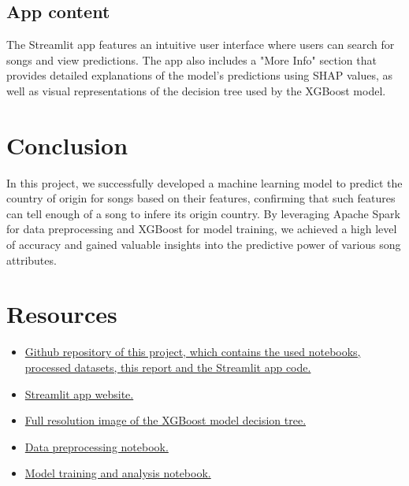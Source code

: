 \documentclass{article}
\begin{document}
\subsection{App content}
The Streamlit app features an intuitive user interface where users can search for songs and view predictions. The app also includes a "More Info" section that provides detailed explanations of the model's predictions using SHAP values, as well as visual representations of the decision tree used by the XGBoost model.

\section{Conclusion}
In this project, we successfully developed a machine learning model to predict the country of origin for songs based on their features, confirming that such features can tell enough of a song to infere its origin country. By leveraging Apache Spark for data preprocessing and XGBoost for model training, we achieved a high level of accuracy and gained valuable insights into the predictive power of various song attributes.

\section{Resources}

\begin{itemize}
    \item \href{https://github.com/FerranAD/songmap}{Github repository of this project, which contains the used notebooks, processed datasets, this report and the Streamlit app code.}
    \item \href{https://songmap.xyz}{Streamlit app website.}
    \item \href{https://raw.githubusercontent.com/FerranAD/songmap/main/images/xgb_tree.png}{Full resolution image of the XGBoost model decision tree.}
    \item \href{https://github.com/FerranAD/songmap/blob/main/preprocessing.ipynb}{Data preprocessing notebook.}
    \item \href{https://github.com/FerranAD/songmap/blob/main/analysis.ipynb}{Model training and analysis notebook.}
\end{itemize}
\end{document}

